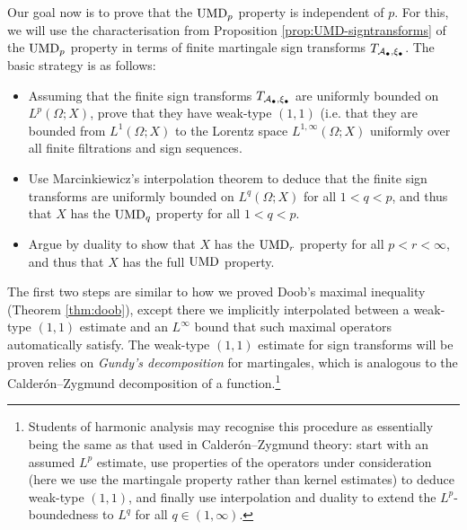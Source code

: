 Our goal now is to prove that the $\mathrm{UMD}_{p}$ property is independent of $p$.
For this, we will use the characterisation from Proposition \ref{prop:UMD-signtransforms} of the $\mathrm{UMD}_{p}$ property in terms of finite martingale sign transforms $T_{\mathcal{A}_{\bullet}, \xi_{\bullet}}$.
The basic strategy is as follows:
\begin{itemize}
\item Assuming that the finite sign transforms $T_{\mathcal{A}_{\bullet},\xi_{\bullet}}$ are uniformly bounded on $L^p(\Omega;X)$, prove that they have weak-type $(1,1)$ (i.e. that they are bounded from $L^1(\Omega;X)$ to the Lorentz space $L^{1,\infty}(\Omega;X)$ uniformly over all finite filtrations and sign sequences.
\item Use Marcinkiewicz's interpolation theorem to deduce that the finite sign transforms are uniformly bounded on $L^q(\Omega;X)$ for all $1 < q < p$, and thus that $X$ has the $\mathrm{UMD}_{q}$ property for all $1 < q < p$.
\item Argue by duality to show that $X$ has the $\mathrm{UMD}_{r}$ property for all $p < r < \infty$, and thus that $X$ has the full $\mathrm{UMD}$ property.
\end{itemize}

The first two steps are similar to how we proved Doob's maximal inequality (Theorem \ref{thm:doob}), except there we implicitly interpolated between a weak-type $(1,1)$ estimate and an $L^\infty$ bound that such maximal operators automatically satisfy.
The weak-type $(1,1)$ estimate for sign transforms will be proven relies on \emph{Gundy's decomposition} for martingales, which is analogous to the Calder\'on--Zygmund decomposition of a function.\footnote{
Students of harmonic analysis may recognise this procedure as essentially being the same as that used in Calder\'on--Zygmund theory: start with an assumed $L^p$ estimate, use properties of the operators under consideration (here we use the martingale property rather than kernel estimates) to deduce weak-type $(1,1)$, and finally use interpolation and duality to extend the $L^p$-boundedness to $L^q$ for all $q \in (1,\infty)$.}


